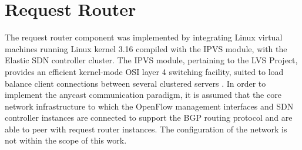\section{Request Router}
\label{section:request-router-implementation}
The request router component was implemented by integrating Linux virtual machines running Linux kernel 3.16 compiled with the \gls{IPVS} module, with the Elastic \gls{SDN} controller cluster.
The \gls{IPVS} module, pertaining to the \gls{LVS} Project, provides an efficient kernel-mode \gls{OSI} layer 4 switching facility, suited to load balance client connections between several clustered servers \cite{LVS}.
In order to implement the \gls{anycast} communication paradigm, it is assumed that the core network infrastructure to which the OpenFlow management interfaces and \gls{SDN} controller instances are connected to support the \gls{BGP} routing protocol and are able to peer with request router instances.
The configuration of the network is not within the scope of this work.
%
